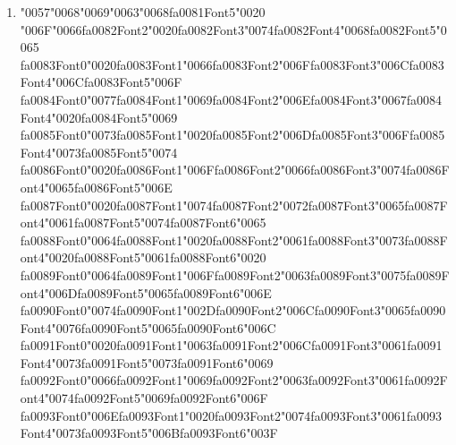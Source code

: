 \documentclass[11pt]{article}
\begin{document}
\begin{enumerate}[leftmargin=*]
  \item {\char"0057}{\char"0068}{\char"0069}{\char"0063}{\char"0068}{\csname fa0081Font5\endcsname\char"0020} {\char"006F}{\char"0066}{\csname fa0082Font2\endcsname\char"0020}{\csname fa0082Font3\endcsname\char"0074}{\csname fa0082Font4\endcsname\char"0068}{\csname fa0082Font5\endcsname\char"0065} {\csname fa0083Font0\endcsname\char"0020}{\csname fa0083Font1\endcsname\char"0066}{\csname fa0083Font2\endcsname\char"006F}{\csname fa0083Font3\endcsname\char"006C}{\csname fa0083Font4\endcsname\char"006C}{\csname fa0083Font5\endcsname\char"006F} {\csname fa0084Font0\endcsname\char"0077}{\csname fa0084Font1\endcsname\char"0069}{\csname fa0084Font2\endcsname\char"006E}{\csname fa0084Font3\endcsname\char"0067}{\csname fa0084Font4\endcsname\char"0020}{\csname fa0084Font5\endcsname\char"0069} {\csname fa0085Font0\endcsname\char"0073}{\csname fa0085Font1\endcsname\char"0020}{\csname fa0085Font2\endcsname\char"006D}{\csname fa0085Font3\endcsname\char"006F}{\csname fa0085Font4\endcsname\char"0073}{\csname fa0085Font5\endcsname\char"0074} {\csname fa0086Font0\endcsname\char"0020}{\csname fa0086Font1\endcsname\char"006F}{\csname fa0086Font2\endcsname\char"0066}{\csname fa0086Font3\endcsname\char"0074}{\csname fa0086Font4\endcsname\char"0065}{\csname fa0086Font5\endcsname\char"006E} {\csname fa0087Font0\endcsname\char"0020}{\csname fa0087Font1\endcsname\char"0074}{\csname fa0087Font2\endcsname\char"0072}{\csname fa0087Font3\endcsname\char"0065}{\csname fa0087Font4\endcsname\char"0061}{\csname fa0087Font5\endcsname\char"0074}{\csname fa0087Font6\endcsname\char"0065} {\csname fa0088Font0\endcsname\char"0064}{\csname fa0088Font1\endcsname\char"0020}{\csname fa0088Font2\endcsname\char"0061}{\csname fa0088Font3\endcsname\char"0073}{\csname fa0088Font4\endcsname\char"0020}{\csname fa0088Font5\endcsname\char"0061}{\csname fa0088Font6\endcsname\char"0020} {\csname fa0089Font0\endcsname\char"0064}{\csname fa0089Font1\endcsname\char"006F}{\csname fa0089Font2\endcsname\char"0063}{\csname fa0089Font3\endcsname\char"0075}{\csname fa0089Font4\endcsname\char"006D}{\csname fa0089Font5\endcsname\char"0065}{\csname fa0089Font6\endcsname\char"006E} {\csname fa0090Font0\endcsname\char"0074}{\csname fa0090Font1\endcsname\char"002D}{\csname fa0090Font2\endcsname\char"006C}{\csname fa0090Font3\endcsname\char"0065}{\csname fa0090Font4\endcsname\char"0076}{\csname fa0090Font5\endcsname\char"0065}{\csname fa0090Font6\endcsname\char"006C} {\csname fa0091Font0\endcsname\char"0020}{\csname fa0091Font1\endcsname\char"0063}{\csname fa0091Font2\endcsname\char"006C}{\csname fa0091Font3\endcsname\char"0061}{\csname fa0091Font4\endcsname\char"0073}{\csname fa0091Font5\endcsname\char"0073}{\csname fa0091Font6\endcsname\char"0069} {\csname fa0092Font0\endcsname\char"0066}{\csname fa0092Font1\endcsname\char"0069}{\csname fa0092Font2\endcsname\char"0063}{\csname fa0092Font3\endcsname\char"0061}{\csname fa0092Font4\endcsname\char"0074}{\csname fa0092Font5\endcsname\char"0069}{\csname fa0092Font6\endcsname\char"006F} {\csname fa0093Font0\endcsname\char"006E}{\csname fa0093Font1\endcsname\char"0020}{\csname fa0093Font2\endcsname\char"0074}{\csname fa0093Font3\endcsname\char"0061}{\csname fa0093Font4\endcsname\char"0073}{\csname fa0093Font5\endcsname\char"006B}{\csname fa0093Font6\endcsname\char"003F}

\end{enumerate}
\end{document}

